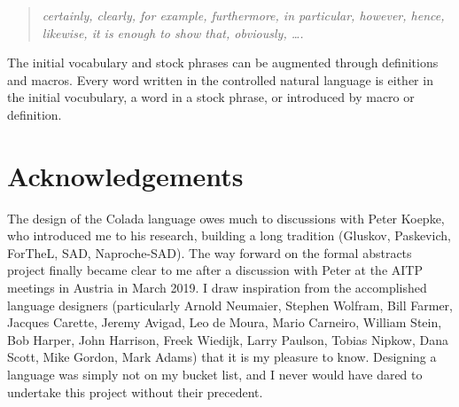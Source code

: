 \documentclass[12pt]{article}
\numberwithin{definition}{section}
\begin{document}
\begin{quote}
{\it certainly, clearly, for example, furthermore, in particular, however,
hence, likewise, it is enough to show that, obviously, \ldots.}
\end{quote}

The initial vocabulary and stock phrases can be augmented through
definitions and macros.  Every word written in the controlled natural
language is either in the initial vocubulary, a word in a stock
phrase, or introduced by macro or definition.



\section{Acknowledgements}
The design of the Colada language owes much to discussions with Peter
Koepke, who introduced me to his research, building a long tradition
(Gluskov, Paskevich, ForTheL, SAD, Naproche-SAD).  The way forward on
the formal abstracts project finally became clear to me after a
discussion with Peter at the AITP meetings in Austria in March 2019. I
draw inspiration from the accomplished language designers
(particularly Arnold Neumaier, Stephen Wolfram, Bill Farmer, Jacques
Carette, Jeremy Avigad, Leo de Moura, Mario Carneiro, William Stein,
Bob Harper, John Harrison, Freek Wiedijk, Larry Paulson, Tobias
Nipkow, Dana Scott, Mike Gordon, Mark Adams) that it is my pleasure to
know.  Designing a language was simply not on my bucket list, and I
never would have dared to undertake this project without their
precedent.
\end{document}
